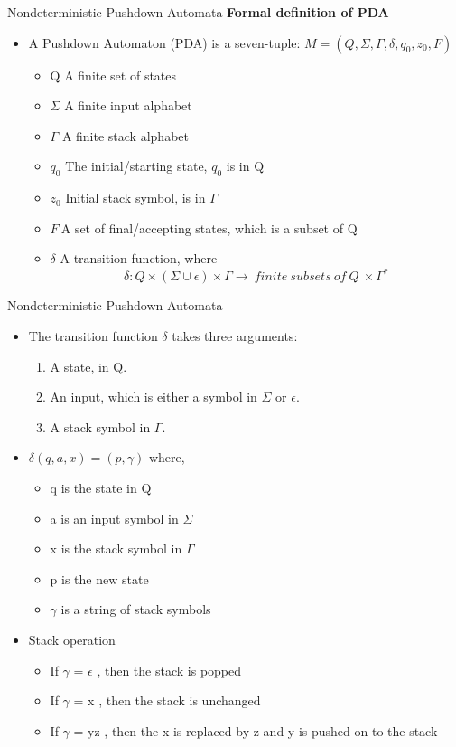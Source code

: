 \documentclass{beamer}
\begin{document}
\begin{frame}{Nondeterministic Pushdown Automata}
	\textbf{ Formal definition of PDA }
		\begin{itemize}
			\item A Pushdown Automaton (PDA) is a seven-tuple: $M = (Q, \Sigma, \Gamma, \delta, q_0, z_0, F)$
			\begin{itemize}
				\item Q A finite set of states
				
				\item $\Sigma$ A finite input alphabet
				
					\item $\Gamma$ A finite stack alphabet
				
					\item $q_0$ The initial/starting state, $q_0$ is in Q
				
					\item $z_0$ Initial stack symbol, is in $\Gamma$
				
					\item $F\ 	$A set of final/accepting states, which is a subset of Q
				
					\item $\delta$	A transition function, where
					$$\delta: Q \times (\Sigma \cup {\epsilon}) \times \Gamma \rightarrow \  finite\  subsets\  of\  Q\  \times \Gamma^*$$
			\end{itemize}
		\end{itemize}
\end{frame}	
\begin{frame}{Nondeterministic Pushdown Automata}
	\begin{itemize}
		\item The transition function $\delta$ takes three arguments:
	\begin{enumerate}
		\item A state, in Q.
			\item An input, which is either a symbol in $\Sigma$ or $\epsilon$.
		\item A stack symbol in $\Gamma$.
	\end{enumerate}
\item $\delta(q, a, x)=(p, \gamma)$ where,
\begin{itemize}
	\item q is the state in Q
	\item a is an input symbol in $\Sigma$
	\item x is the stack symbol in $\Gamma$
	\item p is the new state
	\item $\gamma$ is a string of stack symbols
\end{itemize}
\item Stack operation
\begin{itemize}
	\item If $\gamma$ = $\epsilon$ , then the stack is popped
	\item	If $\gamma$ = x , then the stack is unchanged
	\item	If $\gamma$ = yz , then the x is replaced by z and y is pushed on to the stack
\end{itemize}
	\end{itemize}
\end{frame}	
\end{document}
